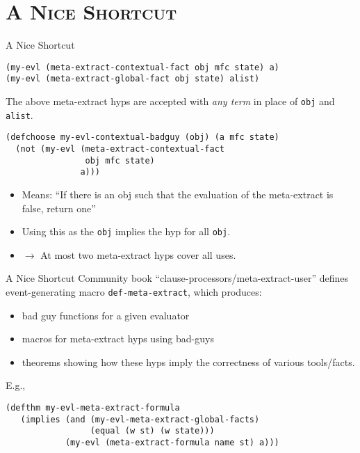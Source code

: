 \section[\scshape Shortcut]{\scshape A Nice Shortcut}
\begin{frame}[fragile] {A Nice Shortcut}
\begin{Verbatim}[fontsize=\small]
(my-evl (meta-extract-contextual-fact obj mfc state) a)
(my-evl (meta-extract-global-fact obj state) alist)
\end{Verbatim}
The above meta-extract hyps are accepted with \textit{any term} in place of \texttt{obj} and \texttt{alist}.
\begin{Verbatim}[fontsize=\small]
(defchoose my-evl-contextual-badguy (obj) (a mfc state)
  (not (my-evl (meta-extract-contextual-fact
                obj mfc state)
               a)))
\end{Verbatim}
\begin{itemize}
\item Means: ``If there is an obj such that the evaluation of the meta-extract is false, return one''
\item Using this as the \texttt{obj} implies the hyp for all \texttt{obj}.
\item $\rightarrow$ At most two meta-extract hyps cover all uses.
\end{itemize}
\end{frame}
\begin{frame}[fragile] {A Nice Shortcut}
Community book ``clause-processors/meta-extract-user'' defines event-generating macro
\texttt{def-meta-extract}, which produces:
\begin{itemize}
\item bad guy functions for a given evaluator
\item macros for meta-extract hyps using bad-guys
\item theorems showing how these hyps imply the correctness of various tools/facts.
\end{itemize}

E.g., 

\begin{Verbatim}[fontsize=\small]
(defthm my-evl-meta-extract-formula
   (implies (and (my-evl-meta-extract-global-facts)
                 (equal (w st) (w state)))
            (my-evl (meta-extract-formula name st) a)))
\end{Verbatim}

\end{frame}
